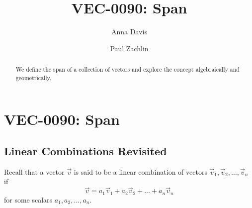 \documentclass{ximera}
\author{Anna Davis \and Paul Zachlin} \title{VEC-0090: Span} \license{CC-BY 4.0}
\begin{document}
\begin{abstract}
 We define the span of a collection of vectors and explore the concept algebraically and geometrically.
\end{abstract}
\maketitle

\section*{VEC-0090: Span}

\subsection*{Linear Combinations Revisited}
Recall that a vector $\vec{v}$ is said to be a linear combination of vectors $\vec{v}_1, \vec{v}_2,\ldots, \vec{v}_n$ if 
$$\vec{v}=a_1\vec{v}_1+ a_2\vec{v}_2+\ldots + a_n\vec{v}_n$$
for some scalars $a_1, a_2, \ldots ,a_n$.
\end{document}
